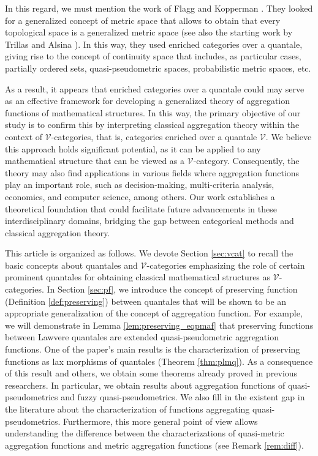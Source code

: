 \documentclass[11pt,a4paper]{amsart}
\theoremstyle{definition}
\begin{document}
	In this regard, we must mention the work of Flagg and Kopperman \cite{Flagg92,Flagg97,FlaggKopp97,Kopp88}. They looked for a generalized concept of metric space that allows to obtain that every topological space is a generalized metric space (see also the starting work by Trillas and Alsina \cite{TrillasAlsina78}).  In this way, they used enriched categories over a quantale, giving rise to the concept of continuity space that includes, as particular cases, partially ordered sets, quasi-pseudometric spaces, probabilistic metric spaces, etc. 
	
		
	As a result, it appears that enriched categories over a quantale could may serve as an effective framework for developing a generalized theory of aggregation functions of mathematical structures. In this way, the primary objective of our study is to confirm this by interpreting classical aggregation theory within the context of $\mathscr{V}$-categories, that is, categories enriched over a quantale $\mathscr{V}$. We believe this approach holds significant potential, as it can be applied to any mathematical structure that can be viewed as a $\mathscr{V}$-category. Consequently, the theory may also find applications in various fields where aggregation functions play an important role, such as decision-making, multi-criteria analysis, economics, and computer science, among others. Our work establishes a theoretical foundation that could facilitate future advancements in these interdisciplinary domains, bridging the gap between categorical methods and classical aggregation theory.
	
	
	This article is organized as follows. We devote Section \ref{sec:vcat} to recall the basic concepts about quantales and $\mathscr{V}$-categories emphasizing the role of certain prominent quantales for obtaining classical mathematical structures as $\mathscr{V}$-categories. In Section \ref{sec:pf}, we introduce the concept of preserving function (Definition \ref{def:preserving}) between quantales that will be shown to be an appropriate generalization of the concept of aggregation function. For example, we will demonstrate in Lemma \ref{lem:preserving_eqpmaf} that preserving functions between Lawvere quantales are extended quasi-pseudometric aggregation functions. One of the paper's main results is the characterization of preserving functions as lax morphisms of quantales (Theorem \ref{thm:plmq}). As a consequence of this result and others, we obtain some theorems already proved in previous researchers. In particular, we obtain results about aggregation functions of quasi-pseudometrics and fuzzy quasi-pseudometrics. We also fill in the existent gap in the literature about the characterization of functions aggregating quasi-pseudometrics. Furthermore, this more general point of view allows understanding the difference between the characterizations of quasi-metric aggregation functions and metric aggregation functions (see Remark \ref{rem:diff}).
	
\end{document}
